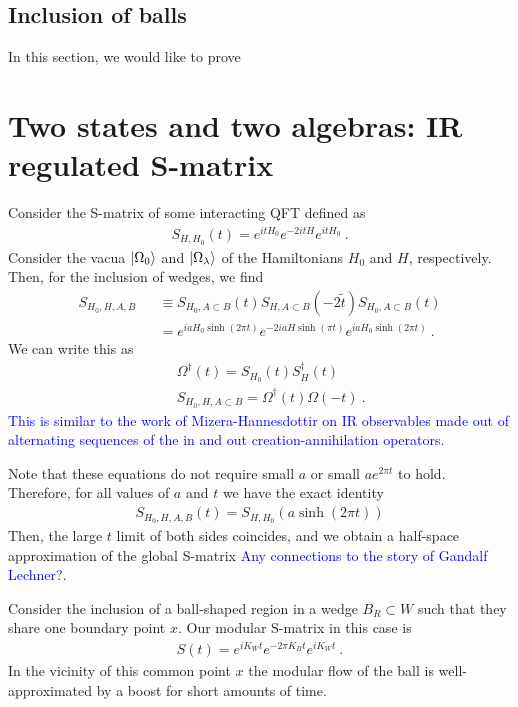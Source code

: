 \documentclass[a4paper,11pt]{article}
\theoremstyle{definition}
\newcommand{\nn}{\nonumber}
\newcommand{\NL}[1]{\textcolor{blue}{#1}}
\begin{document}
\subsection{Inclusion of balls}
In this section, we would like to prove 


\section{Two states and two algebras: IR regulated S-matrix}

Consider the S-matrix of some interacting QFT defined as
\begin{eqnarray}
S_{H,H_0}(t)=e^{i t H_0}e^{-2i t H}e^{it H_0}\ .
\end{eqnarray}
Consider the vacua $\ket{\Omega_0}$ and $\ket{\Omega_\lambda}$ of the Hamiltonians $H_0$ and $H$, respectively. Then, for the inclusion of wedges, we find
\begin{eqnarray}
S_{H_0,H,A,B}&&\equiv S_{H_0,A\subset B}(t) S_{H,A\subset B}(-2\tilde{t})S_{H_0,A\subset B}(t)\nn\\
&&=e^{i a H_0 \sinh(2\pi t)} e^{-2i a H \sinh(\pi t)}e^{i a H_0 \sinh(2\pi t)}\ .
\end{eqnarray}
We can write this as 
\begin{eqnarray}
    &&\Omega^\dagger(t)=S_{H_0}(t) S^\dagger_{H}(t)\nn\\
    &&S_{H_0,H,A\subset B}=\Omega^\dagger(t) \Omega(-t)\ .
\end{eqnarray}
\NL{This is similar to the work of Mizera-Hannesdottir on IR observables made out of alternating sequences of the in and out creation-annihilation operators.}


Note that these equations do not require small $a$ or small $ae^{2\pi t}$ to hold. Therefore, for all values of $a$ and $t$ we have the exact identity
\begin{eqnarray}
S_{H_0,H,A,B}(t)=S_{H,H_0}(a \sinh(2\pi t)) 
\end{eqnarray} 
Then, the large $t$ limit of both sides coincides, and we obtain a half-space approximation of the global S-matrix \NL{Any connections to the story of Gandalf Lechner?}.

Consider the inclusion of a ball-shaped region in a wedge $B_R\subset W$ such that they share one boundary point $x$. Our modular S-matrix in this case is
\begin{eqnarray}
S(t)=e^{i K_W t} e^{-2\pi K_B t} e^{i K_W t}\ .
\end{eqnarray}
In the vicinity of this common point $x$ the modular flow of the ball is well-approximated by a boost for short amounts of time. 
\end{document}
